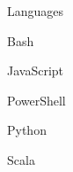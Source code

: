 \begin{skillset}{Languages}
  \item Bash
  \item JavaScript
  \item PowerShell
  \item Python
  \item Scala
\end{skillset}

